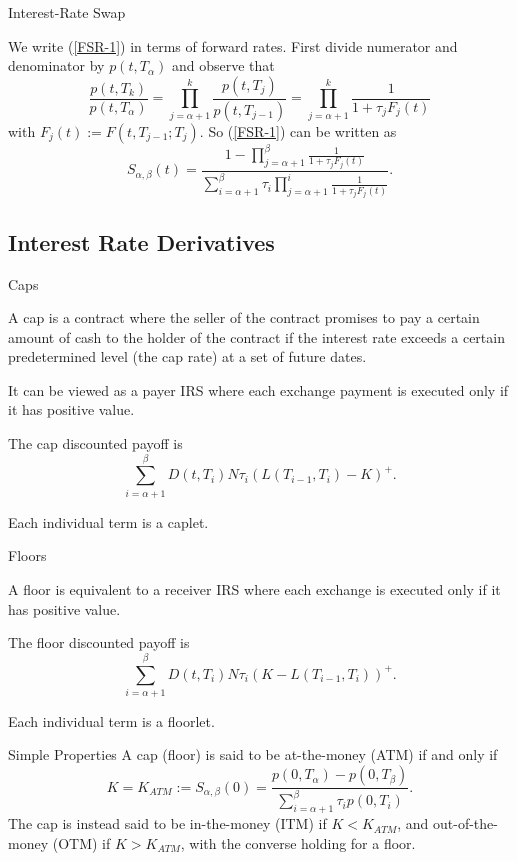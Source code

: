 {Interest-Rate Swap}

We write (\ref{FSR-1}) in terms of forward rates. First divide numerator
and denominator by $p(t,T_{\alpha})$ and observe that
$$
\frac{p(t,T_k)}{p(t,T_{\alpha})}=
\prod_{j=\alpha+1}^k\frac{p(t,T_j)}{p(t,T_{j-1})}=
\prod_{j=\alpha+1}^k\frac{1}{1+\tau_jF_j(t)}$$
with $F_j(t):=F(t,T_{j-1};T_j)$. So (\ref{FSR-1}) can be written as
\begin{equation}
S_{\alpha,\beta}(t)=
\frac{1-\prod_{j=\alpha+1}^{\beta}\frac{1}{1+\tau_jF_j(t)}}
{\sum_{i=\alpha+1}^{\beta}\tau_i\prod_{j=\alpha+1}^{i}\frac{1}{1+\tau_jF_j(t)}}.
\end{equation}

\subsection{Interest Rate Derivatives}

{Caps}


A cap is a contract where the seller of the contract promises to
pay a certain amount of cash to the holder of the contract if the
interest rate exceeds a certain predetermined level (the cap rate)
at a set of future dates.

	It can be viewed as a payer IRS where
each exchange payment is executed only if it has positive value.

	The cap discounted payoff is
$$
\sum_{i=\alpha+1}^{\beta}D(t,T_i)N\tau_i(L(T_{i-1},T_i)-K)^+.
$$

	Each individual term is a caplet.


{Floors}


	A floor is
equivalent to a receiver IRS where each exchange is executed only
if it has positive value.

The floor discounted payoff is
$$
\sum_{i=\alpha+1}^{\beta}D(t,T_i)N\tau_i(K-L(T_{i-1},T_i))^+.
$$

	Each individual term is a floorlet.



{Simple Properties}
A cap
(floor) is said to be at-the-money (ATM) if and only if
$$
K=K_{ATM}:=S_{\alpha,\beta}(0)=\frac{p(0,T_{\alpha})-p(0,T_{\beta})}{\sum_{i=\alpha+1}^{\beta}\tau_ip(0,T_i)}.
$$
The cap is instead said to be in-the-money (ITM) if $K<K_{ATM}$,
and out-of-the-money (OTM) if $K>K_{ATM}$, with the converse
holding for a floor.

